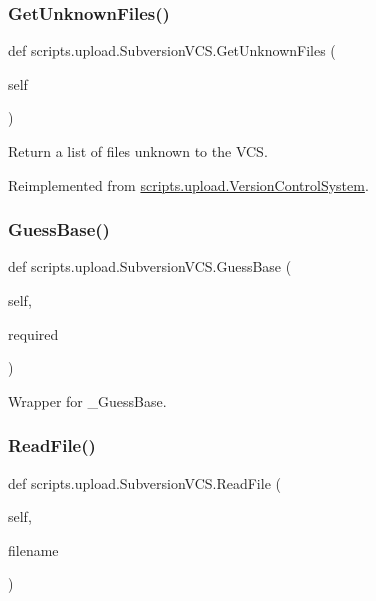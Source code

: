 \subsubsection{\texorpdfstring{GetUnknownFiles()}{GetUnknownFiles()}}
{\footnotesize\ttfamily def scripts.\+upload.\+Subversion\+V\+C\+S.\+Get\+Unknown\+Files (\begin{DoxyParamCaption}\item[{}]{self }\end{DoxyParamCaption})}

\begin{DoxyVerb}Return a list of files unknown to the VCS.\end{DoxyVerb}
 

Reimplemented from \mbox{\hyperlink{classscripts_1_1upload_1_1_version_control_system_a622bbb4e8be9c1cdfde8aa1af1f7f553}{scripts.\+upload.\+Version\+Control\+System}}.

\mbox{\label{classscripts_1_1upload_1_1_subversion_v_c_s_acde8a0f94bd1f829b7dcddf133c56c39}} 
\subsubsection{\texorpdfstring{GuessBase()}{GuessBase()}}
{\footnotesize\ttfamily def scripts.\+upload.\+Subversion\+V\+C\+S.\+Guess\+Base (\begin{DoxyParamCaption}\item[{}]{self,  }\item[{}]{required }\end{DoxyParamCaption})}

\begin{DoxyVerb}Wrapper for _GuessBase.\end{DoxyVerb}
 \mbox{\label{classscripts_1_1upload_1_1_subversion_v_c_s_a0e6d9933a9c8dd10e71eb11927ce6a76}} 
\subsubsection{\texorpdfstring{ReadFile()}{ReadFile()}}
{\footnotesize\ttfamily def scripts.\+upload.\+Subversion\+V\+C\+S.\+Read\+File (\begin{DoxyParamCaption}\item[{}]{self,  }\item[{}]{filename }\end{DoxyParamCaption})}


